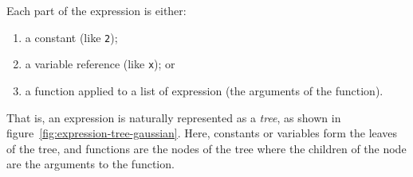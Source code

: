 \documentclass[11pt, a4paper]{article}
\begin{document}
Each part of the expression is either:
\begin{enumerate}
\item a constant (like \texttt{2});
\item a variable reference (like \texttt{x}); or 
\item a function applied to a list of expression (the arguments of the
  function).
\end{enumerate}
That is, an expression is naturally represented as a \emph{tree}, as
shown in figure~\ref{fig:expression-tree-gaussian}. Here, constants or
variables form the leaves of the tree, and functions are the nodes of
the tree where the children of the node are the arguments to the
function.
\end{document}
